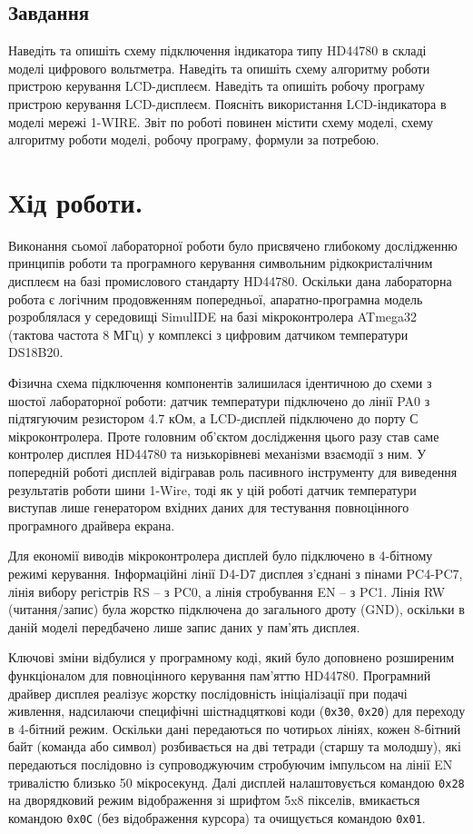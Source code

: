 \documentclass[14pt, a4paper]{extreport}
\begin{document}
	\subsection*{Завдання}
	Наведіть та опишіть схему підключення індикатора типу HD44780 в складі моделі
	цифрового вольтметра. Наведіть та опишіть схему алгоритму роботи пристрою керування LCD-дисплеєм. Наведіть та опишіть робочу програму пристрою керування LCD-дисплеєм. Поясніть використання LCD-індикатора в моделі мережі 1-WIRE. Звіт по роботі повинен містити схему моделі, схему алгоритму роботи моделі, робочу програму, формули за потребою.
	
	\section*{Хід роботи.}
	
	Виконання сьомої лабораторної роботи було присвячено глибокому дослідженню принципів роботи та програмного керування символьним рідкокристалічним дисплеєм на базі промислового стандарту HD44780. Оскільки дана лабораторна робота є логічним продовженням попередньої, апаратно-програмна модель розроблялася у середовищі SimulIDE на базі мікроконтролера ATmega32 (тактова частота 8 МГц) у комплексі з цифровим датчиком температури DS18B20.
	
	
	Фізична схема підключення компонентів залишилася ідентичною до схеми з шостої лабораторної роботи: датчик температури підключено до лінії PA0 з підтягуючим резистором 4.7 кОм, а LCD-дисплей підключено до порту С мікроконтролера. Проте головним об'єктом дослідження цього разу став саме контролер дисплея HD44780 та низькорівневі механізми взаємодії з ним. У попередній роботі дисплей відігравав роль пасивного інструменту для виведення результатів роботи шини 1-Wire, тоді як у цій роботі датчик температури виступав лише генератором вхідних даних для тестування повноцінного програмного драйвера екрана.
	
	Для економії виводів мікроконтролера дисплей було підключено в 4-бітному режимі керування. Інформаційні лінії D4-D7 дисплея з'єднані з пінами PC4-PC7, лінія вибору регістрів RS -- з PC0, а лінія стробування EN -- з PC1. Лінія RW (читання/запис) була жорстко підключена до загального дроту (GND), оскільки в даній моделі передбачено лише запис даних у пам'ять дисплея. 
	
	Ключові зміни відбулися у програмному коді, який було доповнено розширеним функціоналом для повноцінного керування пам'яттю HD44780. Програмний драйвер дисплея реалізує жорстку послідовність ініціалізації при подачі живлення, надсилаючи специфічні шістнадцяткові коди (\texttt{0x30}, \texttt{0x20}) для переходу в 4-бітний режим. Оскільки дані передаються по чотирьох лініях, кожен 8-бітний байт (команда або символ) розбивається на дві тетради (старшу та молодшу), які передаються послідовно із супроводжуючим стробуючим імпульсом на лінії EN тривалістю близько 50 мікросекунд. Далі дисплей налаштовується командою \texttt{0x28} на дворядковий режим відображення зі шрифтом 5x8 пікселів, вмикається командою \texttt{0x0C} (без відображення курсора) та очищується командою \texttt{0x01}.
	
\end{document}
